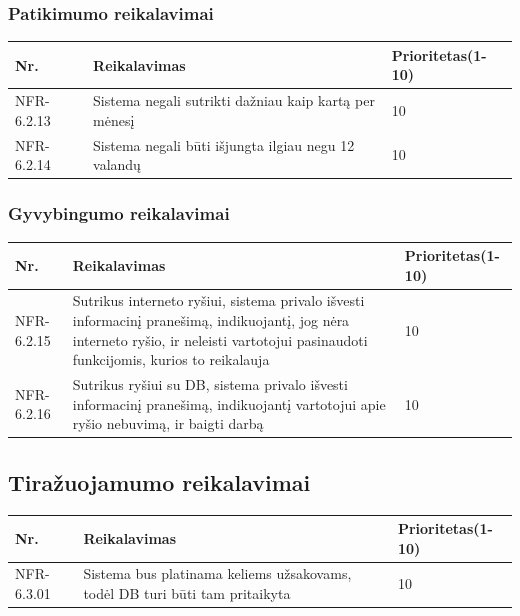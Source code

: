\documentclass[oneside]{VUMIFPSkursinis}
\begin{document}
\subsubsection{Patikimumo reikalavimai}
\begin{table}[htbp]
	\begin{tabularx}{1\textwidth}{ |P{2.5cm}|X|P{3cm }| }  \hline
		Nr. & Reikalavimas & Prioritetas(1-10) \\ \hline
		NFR-6.2.13 & Sistema negali sutrikti dažniau kaip kartą per mėnesį & 10 \\ \hline
		NFR-6.2.14 & Sistema negali būti išjungta ilgiau negu 12 valandų & 10  \\ \hline
	\end{tabularx}
\end{table}

\pagebreak

\subsubsection{Gyvybingumo reikalavimai}
\begin{table}[htbp]
	\begin{tabularx}{1\textwidth}{ |P{2.5cm}|X|P{3cm }| }  \hline
		Nr. & Reikalavimas & Prioritetas(1-10) \\ \hline
		NFR-6.2.15 & Sutrikus interneto ryšiui, sistema privalo išvesti informacinį pranešimą, indikuojantį, jog nėra interneto ryšio, ir neleisti vartotojui pasinaudoti funkcijomis, kurios to reikalauja & 10 \\ \hline
		NFR-6.2.16 & Sutrikus ryšiui su DB, sistema privalo išvesti informacinį pranešimą, indikuojantį vartotojui apie ryšio nebuvimą, ir baigti darbą & 10 \\ \hline
	\end{tabularx}
\end{table}

\subsection{Tiražuojamumo reikalavimai}
\begin{table}[htbp]
	\begin{tabularx}{1\textwidth}{ |P{2.5cm}|X|P{3cm }| }  \hline
		Nr. & Reikalavimas & Prioritetas(1-10) \\ \hline
		NFR-6.3.01 & Sistema bus platinama keliems užsakovams, todėl DB turi būti tam pritaikyta & 10 \\ \hline
	\end{tabularx}
\end{table}
\end{document}
